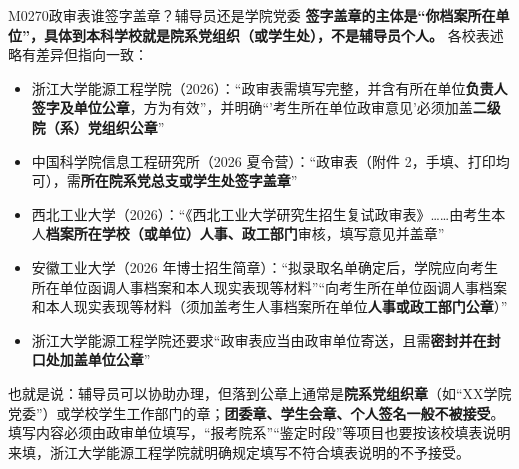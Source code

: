 \begin{qa}{M0270}{政审表谁签字盖章？辅导员还是学院党委}
\textbf{签字盖章的主体是“你档案所在单位”，具体到本科学校就是院系党组织（或学生处），不是辅导员个人。} 各校表述略有差异但指向一致：

\begin{itemize}
  \item 浙江大学能源工程学院（2026）：“政审表需填写完整，并含有所在单位\textbf{负责人签字及单位公章}，方为有效”，并明确“'考生所在单位政审意见'必须加盖\textbf{二级院（系）党组织公章}”
  \item 中国科学院信息工程研究所（2026 夏令营）：“政审表（附件 2，手填、打印均可），需\textbf{所在院系党总支或学生处签字盖章}”
  \item 西北工业大学（2026）：“《西北工业大学研究生招生复试政审表》……由考生本人\textbf{档案所在学校（或单位）人事、政工部门}审核，填写意见并盖章”
  \item 安徽工业大学（2026 年博士招生简章）：“拟录取名单确定后，学院应向考生所在单位函调人事档案和本人现实表现等材料”“向考生所在单位函调人事档案和本人现实表现等材料（须加盖考生人事档案所在单位\textbf{人事或政工部门公章}）”
  \item 浙江大学能源工程学院还要求“政审表应当由政审单位寄送，且需\textbf{密封并在封口处加盖单位公章}”
\end{itemize}

也就是说：辅导员可以协助办理，但落到公章上通常是\textbf{院系党组织章}（如“XX学院党委”）或学校学生工作部门的章；\textbf{团委章、学生会章、个人签名一般不被接受}。填写内容必须由政审单位填写，“报考院系”“鉴定时段”等项目也要按该校填表说明来填，浙江大学能源工程学院就明确规定填写不符合填表说明的不予接受。
\end{qa}

